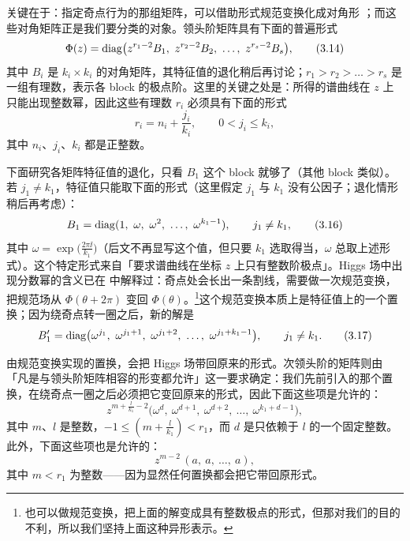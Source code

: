 关键在于：指定奇点行为的那组矩阵，可以借助形式规范变换化成对角形 \cite{26}；而这些对角矩阵正是我们要分类的对象。领头阶矩阵具有下面的普遍形式
\begin{equation}
\Phi(z) = \diag\bigl(z^{r_1-2}B_1,\ z^{r_2-2}B_2,\ \dots,\ z^{r_s-2}B_s\bigr),
\label{eq:3.14}\tag{3.14}
\end{equation}
其中 $B_i$ 是 $k_i\times k_i$ 的对角矩阵，其特征值的退化稍后再讨论；$r_1>r_2>\dots>r_s$ 是一组有理数，表示各 block 的极点阶。这里的关键之处是：所得的谱曲线在 $z$ 上只能出现整数幂，因此这些有理数 $r_i$ 必须具有下面的形式
\begin{equation}
r_i = n_i + \frac{j_i}{k_i},\qquad 0 < j_i \le k_i,
\label{eq:3.15}\tag{3.15}
\end{equation}
其中 $n_i$、$j_i$、$k_i$ 都是正整数。

下面研究各矩阵特征值的退化，只看 $B_1$ 这个 block 就够了（其他 block 类似）。若 $j_1\ne k_1$，特征值只能取下面的形式（这里假定 $j_1$ 与 $k_1$ 没有公因子；退化情形稍后再考虑）：
\begin{equation}
B_1 = \operatorname{diag}(1,\ \omega,\ \omega^2,\ \dots,\ \omega^{k_1-1}),\qquad j_1\ne k_1,
\label{eq:3.16}\tag{3.16}
\end{equation}
其中 $\omega = \exp\bigl(\tfrac{2\pi\ii}{k_1}\bigr)$（后文不再显写这个值，但只要 $k_1$ 选取得当，$\omega$ 总取上述形式）。这个特定形式来自「要求谱曲线在坐标 $z$ 上只有整数阶极点」。Higgs 场中出现分数幂的含义已在 \cite{26} 中解释过：奇点处会长出一条割线，需要做一次规范变换，把规范场从 $\Phi(\theta+2\pi)$ 变回 $\Phi(\theta)$。\footnote{也可以做规范变换，把上面的解变成具有整数极点的形式，但那对我们的目的不利，所以我们坚持上面这种异形表示。}这个规范变换本质上是特征值上的一个置换；因为绕奇点转一圈之后，新的解是
\begin{equation}
B'_1 = \diag\bigl(\omega^{j_1},\ \omega^{j_1+1},\ \omega^{j_1+2},\ \dots,\ \omega^{j_1+k_1-1}\bigr),\qquad j_1\ne k_1 .
\label{eq:3.17}\tag{3.17}
\end{equation}

由规范变换实现的置换，会把 Higgs 场带回原来的形式。次领头阶的矩阵则由「凡是与领头阶矩阵相容的形变都允许」这一要求确定：我们先前引入的那个置换，在绕奇点一圈之后必须把它变回原来的形式，因此下面这些项是允许的：
\begin{equation}
z^{m+\frac{l}{k_1}-2}\bigl(\omega^d,\ \omega^{d+1},\ \omega^{d+2},\ \dots,\ \omega^{k_1+d-1}\bigr),
\label{eq:3.18}\tag{3.18}
\end{equation}
其中 $m$、$l$ 是整数，$-1\le (m+\tfrac{l}{k_1}) < r_1$，而 $d$ 是只依赖于 $l$ 的一个固定整数。此外，下面这些项也是允许的：
\begin{equation}
z^{m-2}\,(a,\ a,\ \dots,\ a),
\label{eq:3.19}\tag{3.19}
\end{equation}
其中 $m<r_1$ 为整数——因为显然任何置换都会把它带回原形式。

